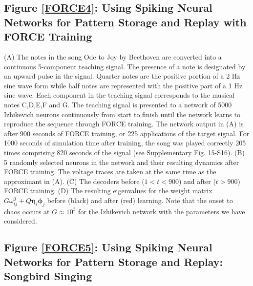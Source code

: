 \documentclass[11pt]{article} %
\begin{document}
\subsection*{Figure \ref{FORCE4}: Using Spiking Neural Networks for Pattern Storage and Replay with FORCE Training} 
(A) The notes in the song Ode to Joy by Beethoven are converted into a continuous 5-component teaching signal.  The presence of a note is designated by an upward pulse in the signal.  Quarter notes are the positive portion of a 2 Hz sine wave form while half notes are represented with the positive part of a 1 Hz sine wave.   Each component in the teaching signal corresponds to the musical notes C,D,E,F and G.  The teaching signal is presented to a network of 5000 Izhikevich neurons continuously from start to finish until the network learns to reproduce the sequence through FORCE training.  The network output in (A) is after 900 seconds of FORCE training, or 225 applications of the target signal.  For 1000 seconds of simulation time after training, the song was played correctly 205 times comprising 820 seconds of the signal (see Supplementary Fig. 15-S16).    (B) 5 randomly selected neurons in the network and their resulting dynamics after FORCE training.  The voltage traces are taken at the same time as the approximant in (A).  (C) The decoders before ($1<t<900$) and after ($t>900$) FORCE training.   (D) The resulting eigenvalues for the weight matrix $G\omega_{ij}^0 + Q\bm \eta_i \bm \phi_j$ before (black) and after (red) learning.   Note that the onset to chaos occurs at $G \approx 10^3$ for the Izhikevich network with the parameters we have considered.  

\subsection*{Figure \ref{FORCE5}: Using Spiking Neural Networks for Pattern Storage and Replay:  Songbird Singing}
\end{document}
